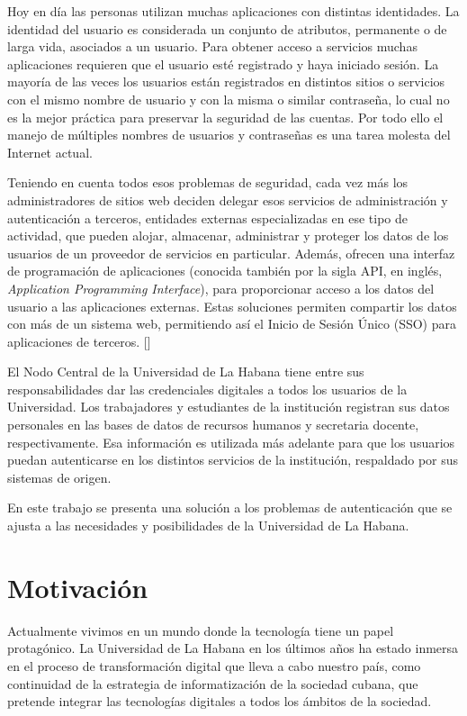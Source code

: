 Hoy en día las personas utilizan muchas aplicaciones con distintas identidades. La identidad del usuario es considerada un conjunto de atributos, permanente o de larga vida, asociados a un usuario. Para obtener acceso a servicios muchas aplicaciones requieren que el usuario esté registrado y haya iniciado sesión. La mayoría de las veces los usuarios están registrados en distintos sitios o servicios con el mismo nombre de usuario y con la misma o similar contraseña, lo cual no es la mejor práctica para preservar la seguridad de las cuentas. Por todo ello el manejo de múltiples nombres de usuarios y contraseñas es una tarea molesta del Internet actual.

Teniendo en cuenta todos esos problemas de seguridad, cada vez más los administradores de sitios web deciden delegar esos servicios de administración y autenticación a terceros, entidades externas especializadas en ese tipo de actividad, que pueden alojar, almacenar, administrar y proteger los datos de los usuarios de un proveedor de servicios en particular. Además, ofrecen una interfaz de programación de aplicaciones (conocida también por la sigla API, en inglés, \textit{Application Programming Interface}), para proporcionar acceso a los datos del usuario a las aplicaciones externas. Estas soluciones permiten compartir los datos con más de un sistema web, permitiendo así el Inicio de Sesión Único (SSO) para aplicaciones de terceros. [\cite{kutera2016single}]

El Nodo Central de la Universidad de La Habana tiene entre sus responsabilidades dar las credenciales digitales a todos los usuarios de la Universidad. Los trabajadores y estudiantes de la institución registran sus datos personales en las bases de datos de recursos humanos y secretaria docente, respectivamente. Esa información es utilizada más adelante para que los usuarios puedan autenticarse en los distintos servicios de la institución, respaldado por sus sistemas de origen.

En este trabajo se presenta una solución a los problemas de autenticación que se ajusta a las necesidades y posibilidades de la Universidad de La Habana.  

\section*{Motivación}
Actualmente vivimos en un mundo donde la tecnología tiene un papel protagónico. La Universidad de La Habana en los últimos años ha estado inmersa en el proceso de transformación digital que lleva a cabo nuestro país, como continuidad de la estrategia de informatización de la sociedad cubana, que pretende integrar las tecnologías digitales a todos los ámbitos de la sociedad.

